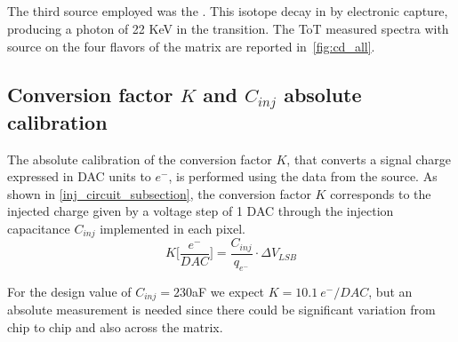 \subsection{}

The third source employed was the . This isotope decay in  by electronic capture, producing a photon of 22 KeV in the transition. The ToT measured spectra with  source on the four flavors of the matrix are reported in~\autoref{fig:cd_all}. 





\subsection{Conversion factor $K$ and $C_{inj}$ absolute calibration}
\label{sec:inj_cap_calib}

The absolute calibration of the conversion factor $K$, that converts a signal charge expressed in DAC units to $e^{-}$, is performed using the data from the  source. 
As shown in \autoref{inj_circuit_subsection}, the conversion factor $K$ corresponds to the injected charge given by a voltage step of 1 DAC through the injection capacitance $C_{inj}$ implemented in each pixel. 
\begin{equation}
K\bigg[\frac{e^{-}}{DAC}\bigg] = \frac{C_{inj}}{q_{e^{-}}} \cdot \Delta V_{LSB} 
\end{equation}

For the design value of $C_{inj}=230$aF we expect $K=10.1~e^-/DAC$, but an absolute measurement is needed since there could be significant variation from chip to chip and also across the matrix.




